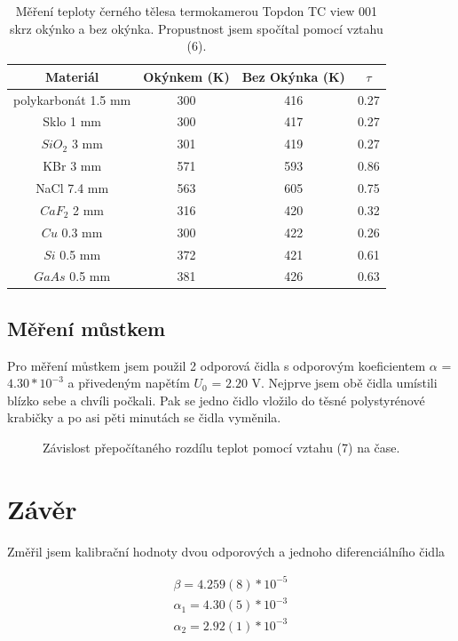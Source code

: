 \documentclass[a4paper,11pt]{article}
\begin{document}
\begin{table}[ht]
  \centering
  \begin{tabular}{| c | c | c | c | }
    \hline
    Materiál & Okýnkem (K) & Bez Okýnka (K) & $\tau$ \\ \hline
    polykarbonát 1.5 mm & 300 & 416 & 0.27 \\
    Sklo 1 mm & 300 & 417 & 0.27  \\ 
    $SiO_2$ 3 mm & 301 & 419 & 0.27 \\ 
    KBr 3 mm& 571 & 593 & 0.86 \\
    NaCl 7.4 mm & 563 & 605 & 0.75\\
    $CaF_2$ 2 mm & 316 & 420 & 0.32 \\ 
    $Cu$ 0.3 mm & 300 & 422 & 0.26 \\ 
    $Si$ 0.5 mm & 372 & 421 & 0.61 \\ 
    $GaAs$ 0.5 mm & 381 & 426 & 0.63 \\ \hline
  \end{tabular}
  \captionsetup{justification=centering}
  \caption{Měření teploty černého tělesa termokamerou Topdon TC view 001 skrz okýnko a bez okýnka. Propustnost jsem spočítal pomocí vztahu (6).}
\end{table}

\subsection{Měření můstkem}

Pro měření můstkem jsem použil 2 odporová čidla s odporovým koeficientem $\alpha$ = $4.30 * 10 ^ {-3}$ 
a přivedeným napětím  $U_0$ = $2.20$ V. Nejprve jsem obě čidla umístili blízko sebe a chvíli počkali. Pak se jedno čidlo vložilo do těsné polystyrénové krabičky a po asi pěti minutách se čidla vyměnila.

\begin{figure}[ht]
  \centering
  
  \caption{ Závislost přepočítaného rozdílu teplot pomocí vztahu (7) na čase.}
\end{figure}

\newpage

\section{Závěr}

Změřil jsem kalibrační hodnoty dvou odporových a jednoho diferenciálního čidla 

\begin{align}
  \beta = 4.259(8) * 10^{-5} \\
  \alpha_1 = 4.30(5) * 10^{-3} \\
  \alpha_2 = 2.92(1) * 10^{-3}\end{align}
\end{document}
